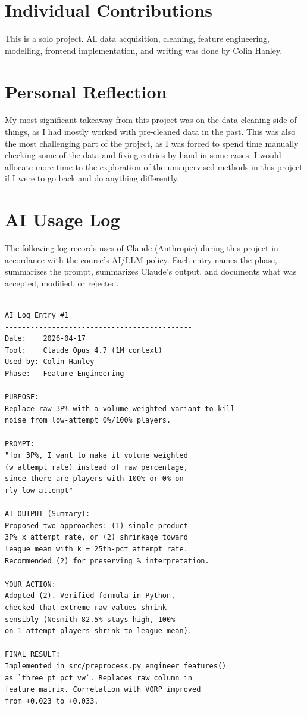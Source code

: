 \documentclass[conference]{IEEEtran}
\begin{document}
\section{Individual Contributions}

This is a solo project. All data acquisition, cleaning, feature
engineering, modelling, frontend implementation, and writing was done by
Colin Hanley.

\section{Personal Reflection}
My most significant takeaway from this project was on the data-cleaning side of things, as I had mostly worked with pre-cleaned data in the past. This was also the most challenging part of the project, as I was forced to spend time manually checking some of the data and fixing entries by hand in some cases. I would allocate more time to the exploration of the unsupervised methods in this project if I were to go back and do anything differently.



\appendices
\section{AI Usage Log}
\label{app:ailog}

The following log records uses of Claude (Anthropic) during this project
in accordance with the course's AI/LLM policy. Each entry names the
phase, summarizes the prompt, summarizes Claude's output, and documents
what was accepted, modified, or rejected.

\begin{verbatim}
--------------------------------------------
AI Log Entry #1
--------------------------------------------
Date:    2026-04-17
Tool:    Claude Opus 4.7 (1M context)
Used by: Colin Hanley
Phase:   Feature Engineering

PURPOSE:
Replace raw 3P% with a volume-weighted variant to kill
noise from low-attempt 0%/100% players.

PROMPT:
"for 3P%, I want to make it volume weighted
(w attempt rate) instead of raw percentage,
since there are players with 100% or 0% on
rly low attempt"

AI OUTPUT (Summary):
Proposed two approaches: (1) simple product
3P% x attempt_rate, or (2) shrinkage toward
league mean with k = 25th-pct attempt rate.
Recommended (2) for preserving % interpretation.

YOUR ACTION:
Adopted (2). Verified formula in Python,
checked that extreme raw values shrink
sensibly (Nesmith 82.5% stays high, 100%-
on-1-attempt players shrink to league mean).

FINAL RESULT:
Implemented in src/preprocess.py engineer_features()
as `three_pt_pct_vw`. Replaces raw column in
feature matrix. Correlation with VORP improved
from +0.023 to +0.033.
--------------------------------------------
\end{verbatim}
\end{document}
